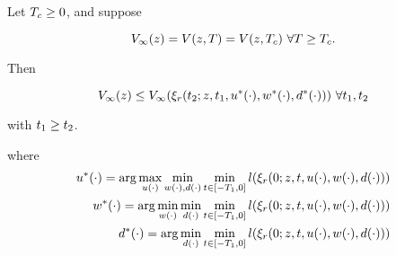 \begin{thm}
Let $T_c \ge 0$, and suppose

\begin{equation}
\label{eq:conv_valfunc}
V_\infty(z) = V(z, T) = V(z, T_c) ~ \forall T \ge T_c.
\end{equation}

Then

\begin{equation}
V_\infty(z) \le V_\infty(\xi_r(t_2; z, t_1, u^*(\cdot), w^*(\cdot), d^*(\cdot))) ~ \forall t_1, t_2
\end{equation}

\noindent with $t_1 \ge t_2$.

\noindent where
\begin{equation}
\begin{aligned}
u^*(\cdot) = \arg \max_{u(\cdot)} \min_{w(\cdot), d(\cdot)} \min_{t \in [-T_1, 0]} l(\xi_r(0; z, t, u(\cdot), w(\cdot), d(\cdot))) \\
w^*(\cdot) = \arg \min_{w(\cdot)} \min_{d(\cdot)} \min_{t \in [-T_1, 0]} l(\xi_r(0; z, t, u(\cdot), w(\cdot), d(\cdot))) \\
d^*(\cdot) = \arg \min_{d(\cdot)} \min_{t \in [-T_1, 0]} l(\xi_r(0; z, t, u(\cdot), w(\cdot), d(\cdot))) 
\end{aligned}
\end{equation}

\end{thm}

